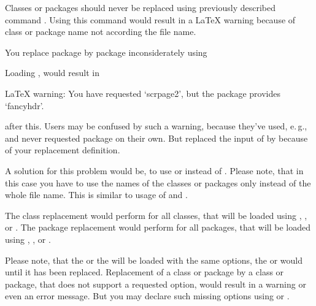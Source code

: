 \begin{Declaration}
\end{Declaration}%
Classes or packages
should never be replaced using previously described command
. Using this command would result in a \LaTeX{} warning
because of class or package name not according the file name.
\begin{Example}
  You replace package  by package 
  inconsiderately using
\begin{lstcode}
\end{lstcode}
  Loading , would result in
\begin{lstcode}
  LaTeX warning: You have requested `scrpage2',
                 but the package provides `fancyhdr'.
\end{lstcode}
  after this. Users may be confused by such a warning, because they've used,
  e.\,g.,  and never requested package
   on their own. But  replaced the input
  of  by  because of your replacement
  definition.
\end{Example}
A solution for this problem would be, to use  or
 instead of
. Please note, that in this case you have
to use the names of the classes or packages only instead of the whole file
name. This is similar to usage of  and
.

The class replacement would perform for all classes, that will be loaded using
, , or . The
package replacement would perform for all packages, that will be loaded using
, , or
.

Please note, that the  or the
 will be loaded with the same options, the
 or  would until it has been
replaced. Replacement of a class or package by a class or package, that does
not support a requested option, would result in a warning or even an error
message. But you may declare such missing options using
 or
.

